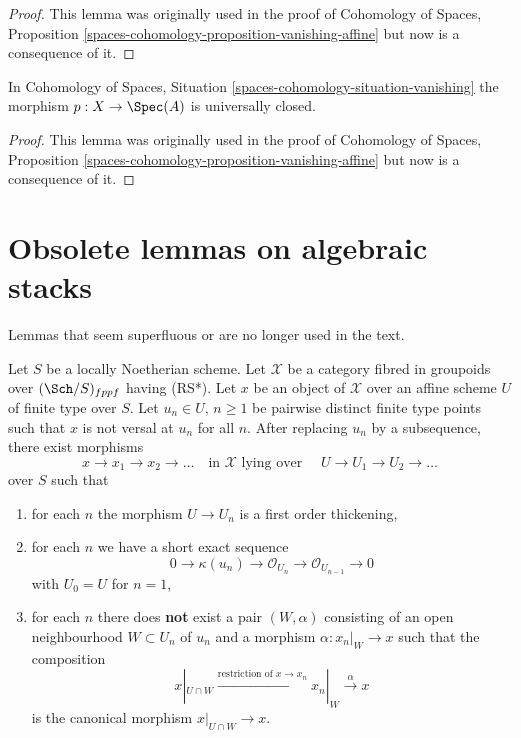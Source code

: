 \begin{proof}
This lemma was originally used in the proof of
Cohomology of Spaces, Proposition
\ref{spaces-cohomology-proposition-vanishing-affine}
but now is a consequence of it.
\end{proof}

\begin{lemma}
\label{lemma-vanishing-universally-closed}
In Cohomology of Spaces, Situation \ref{spaces-cohomology-situation-vanishing}
the morphism $p : X \to \Spec(A)$ is universally closed.
\end{lemma}

\begin{proof}
This lemma was originally used in the proof of
Cohomology of Spaces, Proposition
\ref{spaces-cohomology-proposition-vanishing-affine}
but now is a consequence of it.
\end{proof}






\section{Obsolete lemmas on algebraic stacks}
\label{section-obsolete-on-stacks}

\noindent
Lemmas that seem superfluous or are no longer used in the text.

\begin{lemma}
\label{lemma-infinite-sequence}
Let $S$ be a locally Noetherian scheme. Let $\mathcal{X}$ be a category
fibred in groupoids over $(\Sch/S)_{fppf}$ having (RS*).
Let $x$ be an object of
$\mathcal{X}$ over an affine scheme $U$ of finite type over $S$.
Let $u_n \in U$, $n \geq 1$ be pairwise distinct finite type points
such that $x$ is not versal at $u_n$ for all $n$. After replacing
$u_n$ by a subsequence, there exist morphisms
$$
x \to x_1 \to x_2 \to \ldots
\quad\text{in }\mathcal{X}\text{ lying over }\quad
U \to U_1 \to U_2 \to \ldots
$$
over $S$ such that
\begin{enumerate}
\item for each $n$ the morphism $U \to U_n$ is a first order
thickening,
\item for each $n$ we have a short exact sequence
$$
0 \to \kappa(u_n) \to \mathcal{O}_{U_n} \to \mathcal{O}_{U_{n - 1}} \to 0
$$
with $U_0 = U$ for $n = 1$,
\item for each $n$ there does {\bf not} exist a pair $(W, \alpha)$
consisting of an open neighbourhood $W \subset U_n$ of $u_n$
and a morphism $\alpha : x_n|_W \to x$
such that the composition
$$
x|_{U \cap W} \xrightarrow{\text{restriction of }x \to x_n}
x_n|_W \xrightarrow{\alpha} x
$$
is the canonical morphism $x|_{U \cap W} \to x$.
\end{enumerate}
\end{lemma}

